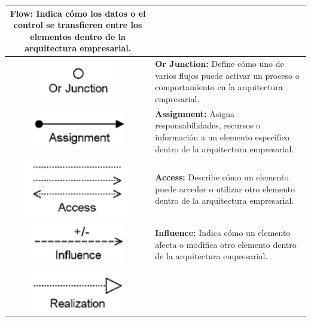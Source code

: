 \begin{longtable}{|c|p{8cm}|}
	\textbf{Flow:} Indica cómo los datos o el control se transfieren entre los elementos dentro de la arquitectura empresarial.                                          \\
	\hline
	\includegraphics{anexos/ARCHI/relations/or.png}             &
	\textbf{Or Junction:} Define cómo uno de varios flujos puede activar un proceso o comportamiento en la arquitectura empresarial.                                     \\
	\hline
	\includegraphics{anexos/ARCHI/relations/assignment.png}     &
	\textbf{Assignment:} Asigna responsabilidades, recursos o información a un elemento específico dentro de la arquitectura empresarial.                                \\
	\hline
	\includegraphics{anexos/ARCHI/relations/access.png}         &
	\textbf{Access:} Describe cómo un elemento puede acceder o utilizar otro elemento dentro de la arquitectura empresarial.                                             \\
	\hline
	\includegraphics{anexos/ARCHI/relations/influence.png}      &
	\textbf{Influence:} Indica cómo un elemento afecta o modifica otro elemento dentro de la arquitectura empresarial.                                                   \\
	\hline
	\includegraphics{anexos/ARCHI/relations/realization.png}    &

\end{longtable}
